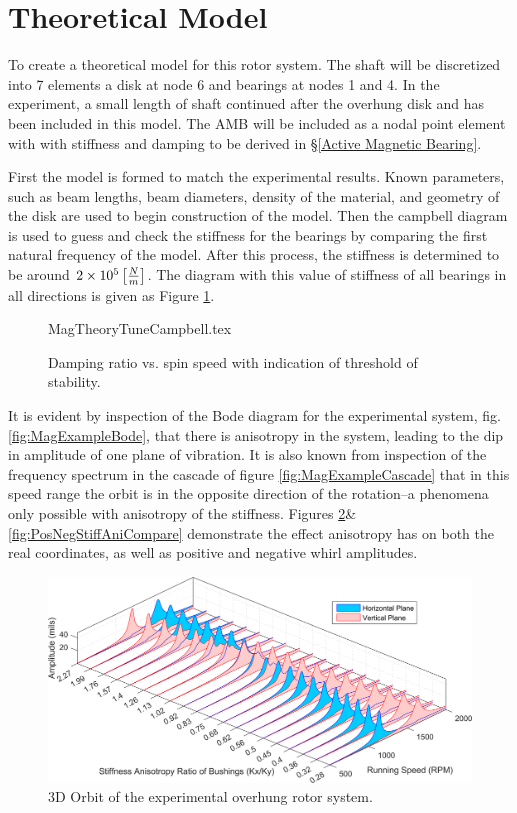 \section{Theoretical Model}
To create a theoretical model for this rotor system. The shaft will be discretized into 7 elements a disk at node 6 and bearings at nodes 1 and 4. In the experiment, a small length of shaft continued after the overhung disk and has been included in this model. The AMB will be included as a nodal point element with with stiffness and damping to be derived in \S\ref{Active Magnetic Bearing}.\par 
First the model is formed to match the experimental results. Known parameters, such as beam lengths, beam diameters, density of the material, and geometry of the disk are used to begin construction of the model. Then the campbell diagram is used to guess and check the stiffness for the bearings by comparing the first natural frequency of the model. After this process, the stiffness is determined to be around $ 2\times 10^{5} \left[\frac{N}{m}\right]$. The diagram with this value of stiffness of all bearings in all directions is given as Figure \ref{fig:MagTheoryTuneCampbell}.
\begin{figure}[!htb]
	\def\width{.6\linewidth}
	\def\height{.4\linewidth}
	\def\sep{3em}
	\centering
	{MagTheoryTuneCampbell.tex}
	\caption{Damping ratio vs. spin speed with indication of threshold of stability.}
	\label{fig:MagTheoryTuneCampbell}
\end{figure}
It is evident by inspection of the Bode diagram for the experimental system, fig.\ref{fig:MagExampleBode}, that there is anisotropy in the system, leading to the dip in amplitude of one plane of vibration. It is also known from inspection of the frequency spectrum in the cascade of figure \ref{fig:MagExampleCascade} that in this speed range the orbit is in the opposite direction of the rotation--a phenomena only possible with anisotropy of the stiffness. Figures \ref{fig:HorVertStiffAniCompare}\&\ref{fig:PosNegStiffAniCompare} demonstrate the effect anisotropy has on both the real coordinates, as well as positive and negative whirl amplitudes.\par 
\begin{figure}
	\centering
	\includegraphics[width=\linewidth]{./figures/Images/Figure_6.png}
	\caption{3D Orbit of the experimental overhung rotor system.}
	\label{fig:HorVertStiffAniCompare}
\end{figure}
